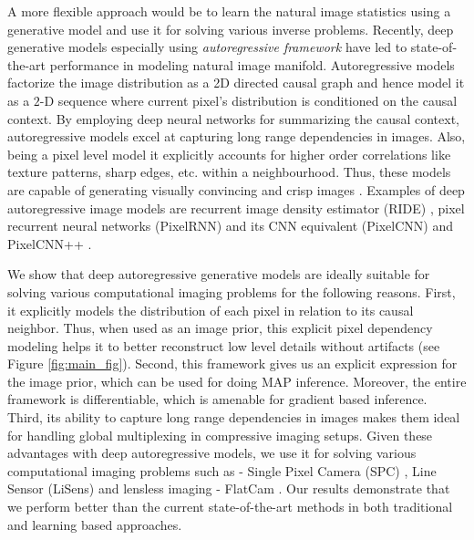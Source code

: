 \documentclass[journal,twoside]{IEEEtran}
\begin{document}
A more flexible approach would be to learn the natural image statistics using a generative model and use it for solving various inverse problems. 
Recently, deep generative models especially using \textit{autoregressive framework} \cite{van2016pixel, theis2015generative,salimans2017pixelcnn++} have led to state-of-the-art performance in modeling natural image manifold. Autoregressive models factorize the image distribution as a 2D directed causal graph and hence model it as a $2$-D sequence where current pixel's distribution is conditioned on the causal context. 
By employing deep neural networks for summarizing the causal context, autoregressive models excel at capturing long range dependencies in images. Also, being a pixel level model it explicitly accounts for higher order correlations like texture patterns, sharp edges, etc. within a neighbourhood. Thus, these models are capable of generating visually convincing and crisp images \cite{van2016pixel}. Examples of deep autoregressive image models are recurrent image density estimator (RIDE) \cite{theis2015generative}, pixel recurrent neural networks (PixelRNN) and its CNN equivalent (PixelCNN) \cite{van2016pixel} and PixelCNN++ \cite{salimans2017pixelcnn++}. 

We show that deep autoregressive generative models are ideally suitable for solving various computational imaging problems for the following reasons. First, it explicitly models the distribution of each pixel in relation to its causal neighbor. Thus, when used as an image prior, this explicit pixel dependency modeling helps it to better reconstruct low level details without artifacts (see Figure \ref{fig:main_fig}). Second, this framework gives us an explicit expression for the image prior, which can be used for doing MAP inference. Moreover, the entire framework is differentiable, which is amenable for gradient based inference. Third, its ability to capture long range dependencies in images makes them ideal for handling global multiplexing in compressive imaging setups. 
Given these advantages with deep autoregressive models, we use it for solving various computational imaging problems such as - Single Pixel Camera (SPC) \cite{duarte2008single}, Line Sensor (LiSens) \cite{wang2015lisens} and lensless imaging - FlatCam \cite{asif2017flatcam}. Our results demonstrate that we perform better than the current state-of-the-art methods in both traditional and learning based approaches. 
\end{document}
